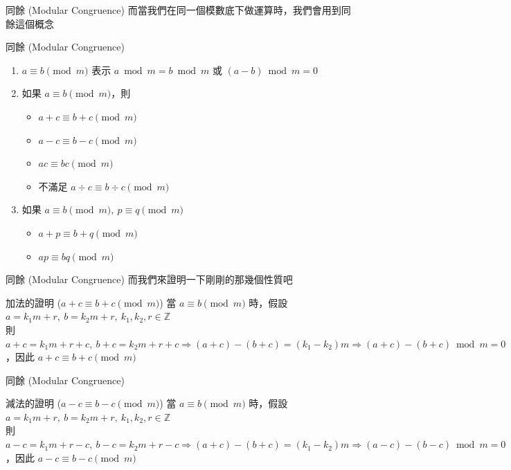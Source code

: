 \documentclass[aspectratio=169]{beamer}
\begin{document}
\begin{frame}{同餘 (Modular Congruence)}
    而當我們在同一個模數底下做運算時，我們會用到同餘這個概念
    \begin{alertblock}{同餘 (Modular Congruence)}
        \begin{enumerate}
            \item $a \equiv b \pmod m$ 表示 $a \bmod m = b \bmod m$ 或 $(a-b) \bmod m = 0$
            \item 如果 $a \equiv b \pmod m$，則
                \begin{itemize}
                    \item $a+c \equiv b+c \pmod m$
                    \item $a-c \equiv b-c \pmod m$
                    \item $ac \equiv bc \pmod m$
                    \item 不滿足 $a \div c \equiv b \div c \pmod m$
                \end{itemize}
            \item 如果 $a \equiv b \pmod m, \ p \equiv q \pmod m$
            \begin{itemize}
                \item $a+p \equiv b+q \pmod m$
                \item $ap \equiv bq \pmod m$
            \end{itemize}
        \end{enumerate}
    \end{alertblock}
\end{frame}

\begin{frame}{同餘 (Modular Congruence)}
    而我們來證明一下剛剛的那幾個性質吧  
    \begin{block}{加法的證明 ($a+c \equiv b+c \pmod m$)}
        當 $a \equiv b \pmod m$ 時，假設 $a=k_1m + r, \ b = k_2m + r, \ k_1, k_2, r \in \mathbb{Z}$ \\
        \vspace{5mm}
        則 $a+c = k_1m+r+c, \ b+c = k_2m + r + c \Rightarrow (a+c)-(b+c) = (k_1-k_2)m \Rightarrow (a+c)-(b+c) \bmod m = 0$，因此 $a+c \equiv b+c \pmod m$
    \end{block}
\end{frame}

\begin{frame}{同餘 (Modular Congruence)}
    \begin{block}{減法的證明 ($a-c \equiv b-c \pmod m$)}
        當 $a \equiv b \pmod m$ 時，假設 $a=k_1m + r, \ b = k_2m + r, \ k_1, k_2, r \in \mathbb{Z}$ \\
        \vspace{5mm}
        則 $a-c = k_1m+r-c, \ b-c = k_2m + r - c \Rightarrow (a+c)-(b+c) = (k_1-k_2)m \Rightarrow (a-c)-(b-c) \bmod m = 0$，因此 $a-c \equiv b-c \pmod m$
    \end{block}
\end{frame}
\end{document}
